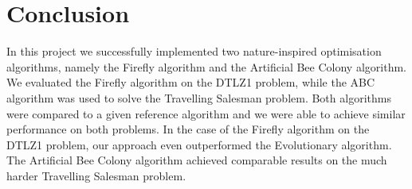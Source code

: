 \section{Conclusion}

In this project we successfully implemented two nature-inspired
optimisation algorithms, namely the Firefly algorithm and the
Artificial Bee Colony algorithm. We evaluated the Firefly algorithm on
the DTLZ1 problem, while the ABC algorithm was used to solve the
Travelling Salesman problem. Both algorithms were compared to a given
reference algorithm and we were able to achieve similar performance on
both problems. In the case of the Firefly algorithm on the DTLZ1
problem, our approach even outperformed the Evolutionary algorithm. The
Artificial Bee Colony algorithm achieved comparable results on the much
harder Travelling Salesman problem.

